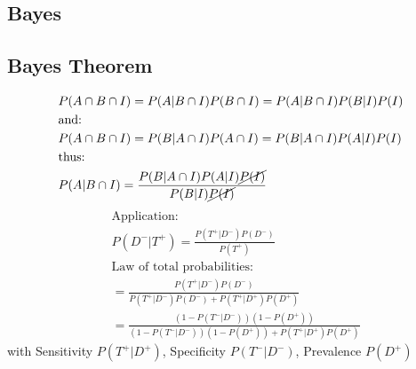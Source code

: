 \documentclass{article}\usepackage[]{graphicx}\usepackage[]{xcolor}
\begin{document}
\begin{multicols*}{2}\raggedcolumns %
\footnotesize
\allowdisplaybreaks

\section{Bayes}

\subsection{Bayes Theorem}
\begin{align*}
&P(A\cap B\cap I)=P(A|B\cap I)P(B\cap I)=P(A|B\cap I)P(B|I)P(I)\\
&\text{and:}\\
&P(A\cap B\cap I)=P(B|A\cap I)P(A\cap I)=P(B|A\cap I)P(A|I)P(I)\\
&\text{thus:}\\
&P(A|B\cap I)=\frac{P(B|A\cap I)P(A|I)\cancel{P(I)}}{P(B|I)\cancel{P(I)}}
\end{align*}
\begin{align*}
&\text{Application:}\\
&P(D^-|T^+)=\frac{P(T^+|D^-)P(D^-)}{P(T^+)}\\
&\text{Law of total probabilities:}\\
&=\frac{P(T^+|D^-)P(D^-)}{P(T^+|D^-)P(D^-)+P(T^+|D^+)P(D^+)}\\
&=\frac{(1-P(T^-|D^-))(1-P(D^+))}{(1-P(T^-|D^-))(1-P(D^+))+P(T^+|D^+)P(D^+)}
\end{align*}
with Sensitivity $P(T^+|D^+)$, Specificity $P(T^-|D^-)$, Prevalence $P(D^+)$


\end{multicols*}
\end{document}
